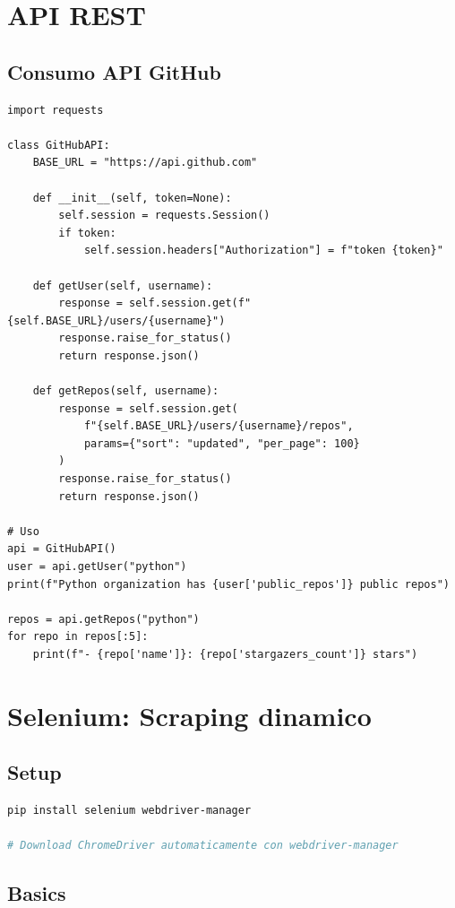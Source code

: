 \section{API REST}

\subsection{Consumo API GitHub}

\begin{lstlisting}
import requests

class GitHubAPI:
    BASE_URL = "https://api.github.com"

    def __init__(self, token=None):
        self.session = requests.Session()
        if token:
            self.session.headers["Authorization"] = f"token {token}"

    def getUser(self, username):
        response = self.session.get(f"{self.BASE_URL}/users/{username}")
        response.raise_for_status()
        return response.json()

    def getRepos(self, username):
        response = self.session.get(
            f"{self.BASE_URL}/users/{username}/repos",
            params={"sort": "updated", "per_page": 100}
        )
        response.raise_for_status()
        return response.json()

# Uso
api = GitHubAPI()
user = api.getUser("python")
print(f"Python organization has {user['public_repos']} public repos")

repos = api.getRepos("python")
for repo in repos[:5]:
    print(f"- {repo['name']}: {repo['stargazers_count']} stars")
\end{lstlisting}

\section{Selenium: Scraping dinamico}

\subsection{Setup}

\begin{lstlisting}[language=bash]
pip install selenium webdriver-manager

# Download ChromeDriver automaticamente con webdriver-manager
\end{lstlisting}

\subsection{Basics}

